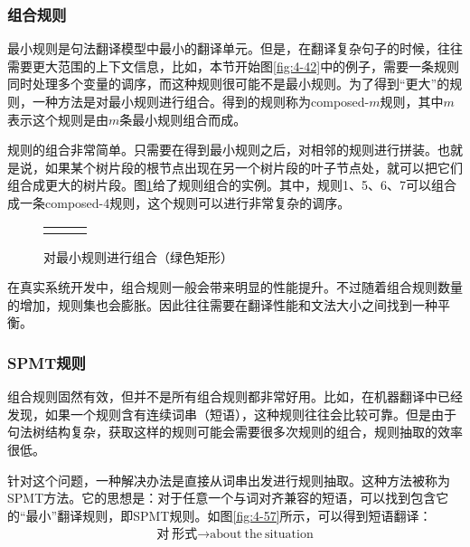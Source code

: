 \subsubsection{组合规则}

\parinterval 最小规则是句法翻译模型中最小的翻译单元。但是，在翻译复杂句子的时候，往往需要更大范围的上下文信息，比如，本节开始图\ref{fig:4-42}中的例子，需要一条规则同时处理多个变量的调序，而这种规则很可能不是最小规则。为了得到``更大''的规则，一种方法是对最小规则进行组合。得到的规则称为composed-$m$规则，其中$m$表示这个规则是由$m$条最小规则组合而成。

\parinterval 规则的组合非常简单。只需要在得到最小规则之后，对相邻的规则进行拼装。也就是说，如果某个树片段的根节点出现在另一个树片段的叶子节点处，就可以把它们组合成更大的树片段。图\ref{fig:4-56}给了规则组合的实例。其中，规则1、5、6、7可以组合成一条composed-4规则，这个规则可以进行非常复杂的调序。

\begin{figure}[htp]
\centering
\begin{tabular}{l l l}
& \subfigure{} &  \subfigure{}
\end{tabular}
\caption{对最小规则进行组合（绿色矩形）}
\label{fig:4-56}
\end{figure}

\parinterval 在真实系统开发中，组合规则一般会带来明显的性能提升。不过随着组合规则数量的增加，规则集也会膨胀。因此往往需要在翻译性能和文法大小之间找到一种平衡。


\subsubsection{SPMT规则}

\parinterval 组合规则固然有效，但并不是所有组合规则都非常好用。比如，在机器翻译中已经发现，如果一个规则含有连续词串（短语），这种规则往往会比较可靠。但是由于句法树结构复杂，获取这样的规则可能会需要很多次规则的组合，规则抽取的效率很低。

\parinterval 针对这个问题，一种解决办法是直接从词串出发进行规则抽取。这种方法被称为SPMT方法\cite{marcu2006spmt:}。它的思想是：对于任意一个与词对齐兼容的短语，可以找到包含它的``最小''翻译规则，即SPMT规则。如图\ref{fig:4-57}所示，可以得到短语翻译：
\begin{eqnarray}
\textrm{对}\ \textrm{形式} \rightarrow \textrm{about}\ \textrm{the}\ \textrm{situation} \nonumber
\end{eqnarray}

